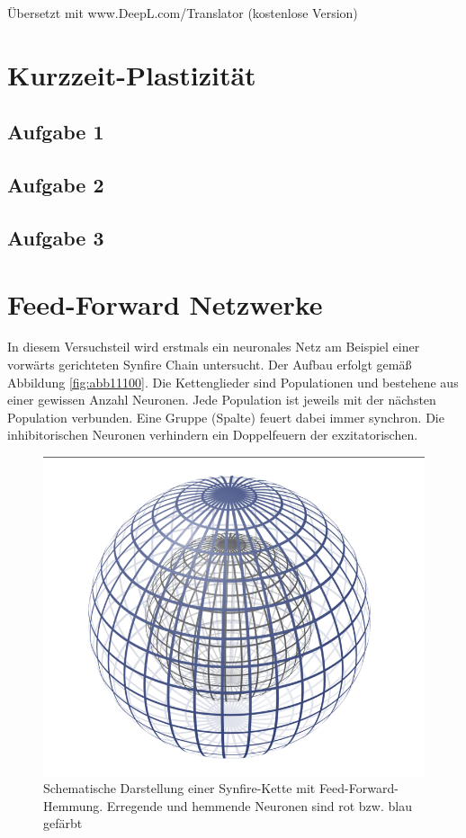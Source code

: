 \documentclass[10pt,a4paper]{scrartcl}
\begin{document}
Übersetzt mit www.DeepL.com/Translator (kostenlose Version)

\newpage


\section{Kurzzeit-Plastizität}


\subsection{Aufgabe 1}


\subsection{Aufgabe 2}


\subsection{Aufgabe 3}


\newpage


\section{Feed-Forward Netzwerke}
In diesem Versuchsteil wird erstmals ein neuronales Netz am Beispiel einer vorwärts gerichteten Synfire Chain untersucht. Der Aufbau erfolgt gemäß Abbildung \ref{fig:abb11100}. Die Kettenglieder sind Populationen und bestehene aus einer gewissen Anzahl Neuronen. Jede Population ist jeweils mit der nächsten Population verbunden. Eine Gruppe (Spalte) feuert dabei immer synchron. Die inhibitorischen Neuronen verhindern ein Doppelfeuern der exzitatorischen. 

\begin{figure} [ht]
\begin{center}
\label{fig:abb4}
\caption{Schematische Darstellung einer Synfire-Kette mit Feed-Forward-Hemmung. Erregende und hemmende Neuronen sind rot bzw. blau gefärbt}
\includegraphics[scale=0.35]{pictures/example.png}
\end{center}
\end{figure}
\end{document}
